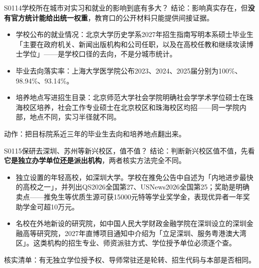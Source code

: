 \begin{qa}{S0114}{学校所在城市对实习和就业的影响到底有多大？}
结论：影响真实存在，但\textbf{没有官方统计能给出统一权重}，教育口的公开材料只能提供间接证据。

\begin{itemize}
  \item 学校公布的就业情况：北京大学历史学系2027年招生指南写明本系硕士毕业生「主要在政府机关、新闻出版机构和公司任职，以及在高校任教和继续攻读博士学位」——是学校口径的去向，不是分城市统计。
  \item 毕业去向落实率：上海大学医学院公布2023、2024、2025届分别为100\%、98.94\%、93.14\%。
  \item 培养地点写进招生目录：北京师范大学社会学院明确社会学学术学位硕士在珠海校区培养，社会工作专业硕士在北京校区和珠海校区均招——同一学院内部，地点不同，实习半径就不同。
\end{itemize}

动作：把目标院系近三年的毕业生去向和培养地点翻出来。
\end{qa}

\begin{qa}{S0115}{保研去深圳、苏州等新兴校区，值不值？}
结论：判断新兴校区值不值，先看\textbf{它是独立办学单位还是派出机构}，两者核实方法完全不同。

\begin{itemize}
  \item 独立设置的年轻高校，如深圳大学。学校在推免公告中自述为「内地进步最快的高校之一」，并列出QS2026全国第27、USNews2026全国第25；奖助是明确卖点——推免生等优质生源可获15000元特等学业奖学金，表现优异者一年奖助学金可超10万元。
  \item 名校在外地新设的研究院，如中国人民大学财政金融学院在深圳设立的深圳金融高等研究院，2027年直博项目通知中介绍为「立足深圳、服务粤港澳大湾区」。这类机构的招生专业、师资派驻方式、学位授予单位必须逐个查。
\end{itemize}

核实清单：有无独立学位授予权、导师常驻还是轮转、招生代码与本部是否相同。
\end{qa}


